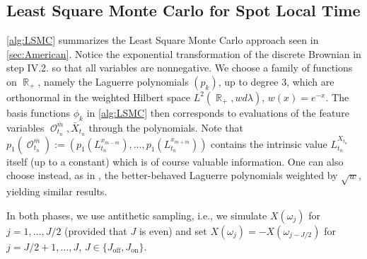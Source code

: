 \documentclass[11pt]{article}
\theoremstyle{plain}
\theoremstyle{definition}
\DeclareMathOperator{\R}{\mathbb{R}}
\DeclareMathOperator{\calO}{\mathcal{O}}
\begin{document}
\subsection{Least Square Monte Carlo for Spot Local Time}\label{app:LSMC}

\cref{alg:LSMC} summarizes the Least Square Monte Carlo approach seen in \cref{sec:American}. Notice the exponential transformation of the discrete Brownian in step IV.2. so that all variables  are nonnegative. We  choose a family of functions on $\R_+$, namely  the Laguerre polynomials $(p_k)$, up to degree $3$, which are orthonormal in the weighted Hilbert space $L^2(\R_+,w d\lambda)$, $w(x) = e^{-x}$. The basis functions $\phi_k$ in \cref{alg:LSMC} then corresponds to  evaluations of the feature variables $\calO_{t_n}^{\bar{m}}, \bar{X}_{t_n}$  through the  polynomials. %
Note that $p_1(\calO_{t_n}^{\bar{m}}) := (p_1(L_{t_n}^{x_{m-\bar{m}}}),\ldots, p_1(L_{t_n}^{x_{m+\bar{m}}}) )$ %
contains the intrinsic value $L_{t_n}^{X_{t_n}}$ itself (up to a constant) which is of course valuable information. %
One can also choose instead, as in \cite{LS}, the better-behaved Laguerre polynomials weighted by $\sqrt{w}$, yielding similar results. %

In both phases, we use antithetic sampling, i.e.,  we simulate $X(\omega_j)$ for $j=1,\ldots,J/2$ (provided that $J$ is even) and set $X(\omega_j) = -X(\omega_{j-J/2})$ for $j=J/2 +1,\ldots,J$,  $J\in \{J_{\text{off}},J_{\text{on}}\}$.  
\end{document}
